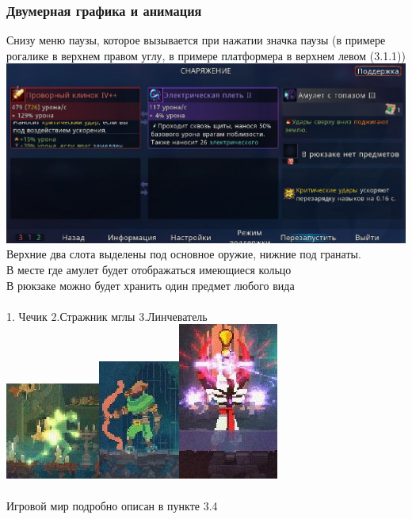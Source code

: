 \documentclass{article}
\begin{document}
\subsubsection{Двумерная графика и анимация}
Снизу меню паузы, которое вызывается при нажатии значка паузы (в примере рогалике в верхнем правом углу, в примере платформера в верхнем левом (3.1.1)) \\
\includegraphics[width=0.6\linewidth]{images/pause.png}\\
Верхние два слота выделены под основное оружие, нижние под гранаты.\\
В месте где амулет будет отображаться имеющиеся кольцо\\
В рюкзаке можно будет хранить один предмет любого вида\\\\
1. Чечик 2.Стражник мглы 3.Линчеватель\\
\includegraphics[width=0.3\linewidth]{dd_chehcik.jpg}\hspace{0.5cm}\includegraphics[width=0.22\linewidth]{dd_luchnik.jpg}\hspace{0.5cm}\includegraphics[width=0.2\linewidth]{images/dd_mag.jpg}
\\\\Игровой мир подробно описан в пункте 3.4
\end{document}

